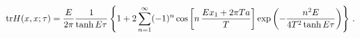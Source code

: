 \begin{equation}
  \label{eq:actorheat}
{\rm tr}H(x,x;\tau)= {E \over 2\pi} {1 \over \tanh E\tau} 
\left\{ 1 + 2 \sum\limits_{n=1}^\infty (-1)^n 
        \cos\left[ 
               n\, {E x_1 + 2 \pi T a \over T}
            \right]
        \exp \left(- {n^2 E \over 4 T^2 \tanh E\tau} \right)
\right\}    \,.
\end{equation}


